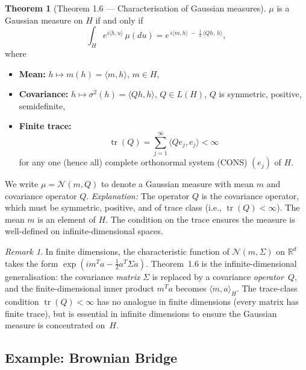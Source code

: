\documentclass[11pt]{article}
\theoremstyle{definition}
\newtheorem{theorem}{Theorem}
\theoremstyle{remark}
\newtheorem{remark}{Remark}
\DeclareMathOperator{\tr}{tr}
\begin{document}
\begin{theorem}[Theorem 1.6 --- Characterisation of Gaussian measures]
$\mu$ is a Gaussian measure on $H$ if and only if
\[
    \int_H e^{i\langle h, u \rangle} \, \mu(du)
    = e^{\, i\langle m, h \rangle \;-\; \frac{1}{2}\,\langle Q h,\, h \rangle},
\]
where
\begin{itemize}
    \item \textbf{Mean:} \; $h \mapsto m(h) = \langle m, h \rangle$, \quad $m \in H$,

    \item \textbf{Covariance:} \; $h \mapsto \sigma^2(h) = \langle Qh, h \rangle$, \quad
          $Q \in L(H)$, \; $Q$ is symmetric, positive, semidefinite,

    \item \textbf{Finite trace:}
          \[
              \tr(Q) = \sum_{j=1}^{\infty} \langle Q e_j, e_j \rangle < \infty
          \]
          for any one (hence all) complete orthonormal system (CONS) $(e_j)$ of $H$.
\end{itemize}
We write $\mu = \mathcal{N}(m, Q)$ to denote a Gaussian measure with mean $m$ and covariance operator $Q$.
\textit{Explanation:} The operator $Q$ is the covariance operator, which must be symmetric, positive, and of trace class (i.e., $\tr(Q) < \infty$). The mean $m$ is an element of $H$. The condition on the trace ensures the measure is well-defined on infinite-dimensional spaces.

\begin{remark}
In finite dimensions, the characteristic function of $\mathcal{N}(m, \Sigma)$ on $\mathbb{R}^d$ takes the form $\exp(im^T a - \frac{1}{2} a^T \Sigma a)$.  Theorem~1.6 is the infinite-dimensional generalisation: the covariance \emph{matrix} $\Sigma$ is replaced by a covariance \emph{operator}~$Q$, and the finite-dimensional inner product $m^T a$ becomes $\langle m, a \rangle_H$.  The trace-class condition $\tr(Q) < \infty$ has no analogue in finite dimensions (every matrix has finite trace), but is essential in infinite dimensions to ensure the Gaussian measure is concentrated on~$H$.
\end{remark}

\end{theorem}

\subsection*{Example: Brownian Bridge}
\end{document}
